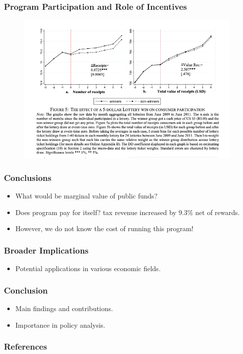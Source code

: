 \documentclass{beamer}
\begin{document}
\begin{frame}
\frametitle{Program Participation and Role of Incentives}
\begin{figure}
    \centering
    \includegraphics[width=\textwidth]{Paper Presentations/Consumers as Tax Auditors/F5.png}
\end{figure}
\end{frame}

\begin{frame}
\frametitle{Conclusions}
\begin{itemize}
    \item What would be marginal value of public funds? 
    \item Does program pay for itself? tax revenue increased by 9.3\% net of rewards.
    \item However, we do not know the cost of running this program!
\end{itemize}
\end{frame}

\begin{frame}
\frametitle{Broader Implications}
\begin{itemize}
    \item Potential applications in various economic fields.
\end{itemize}
\end{frame}

\begin{frame}
\frametitle{Conclusion}
\begin{itemize}
    \item Main findings and contributions.
    \item Importance in policy analysis.
\end{itemize}
\end{frame}

\begin{frame}
\frametitle{References}
\end{frame}
\end{document}
